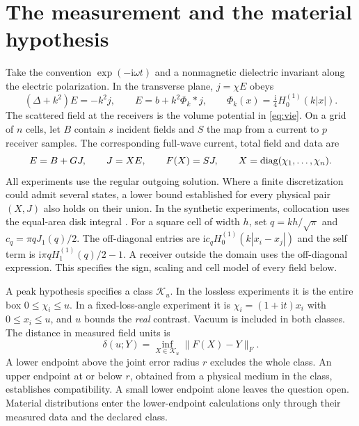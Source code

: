 \section{The measurement and the material hypothesis}\label{sec:model}

Take the convention $\exp(-\mathrm i\omega t)$ and a nonmagnetic dielectric invariant along the electric polarization. In the transverse plane, $j=\chi E$ obeys
\begin{equation}
 (\Delta+k^2)E=-k^2j,\qquad E=b+k^2\Phi_k*j,\qquad
 \Phi_k(x)=\tfrac{\mathrm i}{4}H_0^{(1)}(k|x|).
 \label{eq:vie}
\end{equation}
The scattered field at the receivers is the volume potential in \eqref{eq:vie}. On a grid of $n$ cells, let $B$ contain $s$ incident fields and $S$ the map from a current to $p$ receiver samples. The corresponding full-wave current, total field and data are
\begin{equation}
 E=B+GJ,\qquad J=XE,\qquad F(X)=SJ,\qquad X=\operatorname{diag}(\chi_1,\ldots,\chi_n).
 \label{eq:discrete}
\end{equation}
All experiments use the regular outgoing solution. Where a finite discretization could admit several states, a lower bound established for every physical pair $(X,J)$ also holds on their union. In the synthetic experiments, collocation uses the equal-area disk integral \cite{richmond,colton,chenbook}. For a square cell of width $h$, set $q=kh/\sqrt\pi$ and $c_q=\pi qJ_1(q)/2$. The off-diagonal entries are $\mathrm i c_q H_0^{(1)}(k|x_i-x_j|)$ and the self term is $\mathrm i\pi q H_1^{(1)}(q)/2-1$. A receiver outside the domain uses the off-diagonal expression. This specifies the sign, scaling and cell model of every field below.

A peak hypothesis specifies a class $\mathcal K_u$. In the lossless experiments it is the entire box $0\le\chi_i\le u$. In a fixed-loss-angle experiment it is $\chi_i=(1+\mathrm it)x_i$ with $0\le x_i\le u$, and $u$ bounds the \emph{real} contrast. Vacuum is included in both classes. The distance in measured field units is
\begin{equation}
 \delta(u;Y)=\inf_{X\in\mathcal K_u}\|F(X)-Y\|_F .\label{eq:dist}
\end{equation}
A lower endpoint above the joint error radius $r$ excludes the whole class. An upper endpoint at or below $r$, obtained from a physical medium in the class, establishes compatibility. A small lower endpoint alone leaves the question open. Material distributions enter the lower-endpoint calculations only through their measured data and the declared class.

